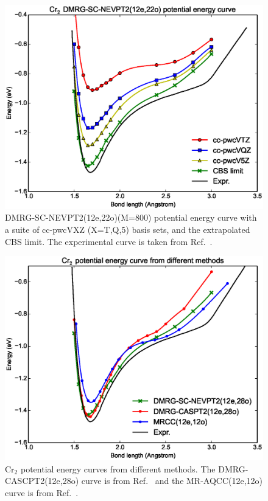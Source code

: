 \begin{figure}
  \centering
  \includegraphics[width=1.1\columnwidth]{Cr2-dmrg-nevpt2.eps}
  \caption{DMRG-SC-NEVPT2(12e,22o)(M=800) potential energy curve with a suite of cc-pwcVXZ (X=T,Q,5) basis sets, and the extrapolated CBS limit. 
The experimental curve is taken from Ref.~.}
  \label{fig:dmrg-nevpt2}
\end{figure}
\begin{figure}
  \includegraphics[width=1.5\columnwidth]{Cr2-curves.eps}
  \caption{Cr$_2$ potential energy curves from different methods.  The DMRG-CASCPT2(12e,28o) curve is from Ref.~ and the MR-AQCC(12e,12o) curve is from Ref.~.}
  \label{fig:compare}
\end{figure}

